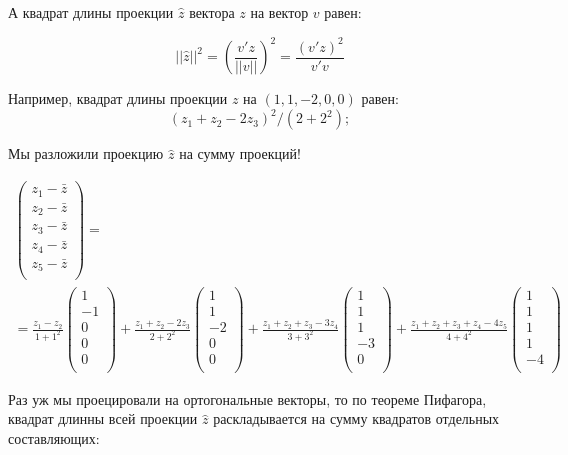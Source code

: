 \documentclass[11pt,russian,]{article}
\newcommand{\1}{\mathbbm{1}}
\begin{document}
А квадрат длины проекции \(\hat z\) вектора \(z\) на вектор \(v\) равен:

\[
||\hat z||^2 = \left(\frac{v'z}{||v||}\right)^2 = \frac{(v'z)^2}{v'v}
\]

Например, квадрат длины проекции \(z\) на \((1, 1, -2, 0, 0)\) равен: \[
(z_1 + z_2 - 2z_3)^2/(2+2^2);
\]

Мы разложили проекцию \(\hat z\) на сумму проекций!

\begin{multline}
\nonumber
\begin{pmatrix}
z_1 - \bar z \\
z_2 - \bar z \\
z_3 - \bar z \\
z_4 - \bar z \\
z_5 - \bar z \\
\end{pmatrix} = \\
= \frac{z_1 - z_2}{1+1^2}\begin{pmatrix}
1 \\
-1 \\
0 \\
0 \\
0 \\
\end{pmatrix} + 
\frac{z_1 + z_2 - 2z_3}{2+2^2}\begin{pmatrix}
1 \\
1 \\
-2 \\
0 \\
0 \\
\end{pmatrix} + 
\frac{z_1 + z_2 + z_3 - 3z_4}{3+3^2}\begin{pmatrix}
1 \\
1 \\
1 \\
-3 \\
0 \\
\end{pmatrix} + 
\frac{z_1 + z_2 + z_3 + z_4 - 4z_5}{4+4^2}\begin{pmatrix}
1 \\
1 \\
1 \\
1 \\
-4 \\
\end{pmatrix}
\end{multline}

Раз уж мы проецировали на ортогональные векторы, то по теореме Пифагора,
квадрат длинны всей проекции \(\hat z\) раскладывается на сумму
квадратов отдельных составляющих:
\end{document}
